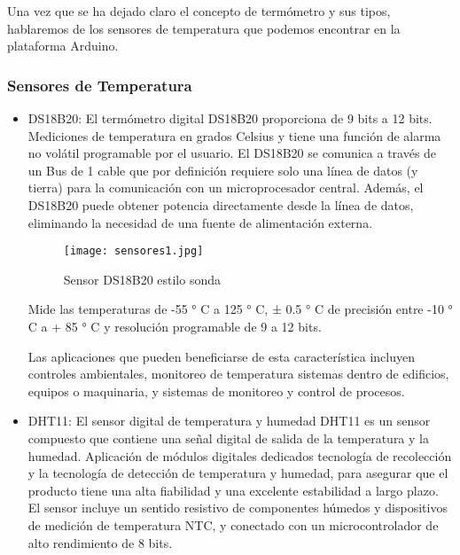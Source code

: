 \par \noindent
Una vez que se ha dejado claro el concepto de termómetro y sus tipos, hablaremos de los sensores de temperatura que podemos encontrar en la plataforma Arduino.

\subsubsection{Sensores de Temperatura}	

\begin{itemize}
	\item DS18B20: El termómetro digital DS18B20 proporciona de 9 bits a 12 bits.
	Mediciones de temperatura en grados Celsius y tiene una función de alarma no volátil programable por el usuario. El DS18B20 se comunica a través de un Bus de 1 cable que por definición requiere solo una línea de datos (y tierra) para la comunicación con un microprocesador central. Además, el DS18B20 puede obtener potencia directamente desde la línea de datos, eliminando la necesidad de una fuente de alimentación externa\cite{ds18b20}.
	
	\begin{figure}[H]
		\centering
		\texttt{[image: sensores1.jpg]}
		\caption{Sensor DS18B20 estilo sonda}
	\end{figure}
	
	\par \noindent
	Mide las temperaturas de -55 ° C a 125 ° C, ± 0.5 ° C de precisión entre -10 ° C a + 85 ° C y resolución programable de 9 a 12 bits.
	
	\par \noindent
	Las aplicaciones que pueden beneficiarse de esta característica incluyen
	controles ambientales, monitoreo de temperatura
	sistemas dentro de edificios, equipos o maquinaria, y
	sistemas de monitoreo y control de procesos\cite{ds18b20}. 
	
	\item DHT11: El sensor digital de temperatura y humedad DHT11 es un sensor compuesto que contiene una
	señal digital de salida de la temperatura y la humedad. Aplicación de módulos digitales dedicados
	tecnología de recolección y la tecnología de detección de temperatura y humedad, para asegurar que
	el producto tiene una alta fiabilidad y una excelente estabilidad a largo plazo. El sensor incluye un sentido resistivo
	de componentes húmedos y dispositivos de medición de temperatura NTC, y conectado con un
	microcontrolador de alto rendimiento de 8 bits\cite{dht11}.
	

\end{itemize}
